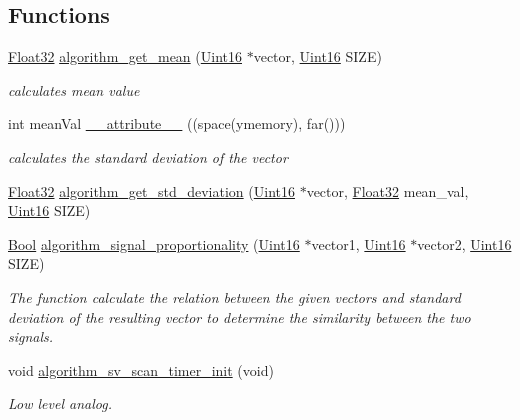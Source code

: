 \subsection*{Functions}
\begin{DoxyCompactItemize}
\item 
\hyperlink{a00072_a87d38f886e617ced2698fc55afa07637}{Float32} \hyperlink{a00038_ac02222eba93356b04a6327ffcf82b5cf}{algorithm\+\_\+get\+\_\+mean} (\hyperlink{a00072_a59a9f6be4562c327cbfb4f7e8e18f08b}{Uint16} $\ast$vector, \hyperlink{a00072_a59a9f6be4562c327cbfb4f7e8e18f08b}{Uint16} S\+I\+Z\+E)
\begin{DoxyCompactList}\small\item\em calculates mean value \end{DoxyCompactList}\item 
int mean\+Val \hyperlink{a00038_afc24892209555236c0000b91cfc8ab15}{\+\_\+\+\_\+attribute\+\_\+\+\_\+} ((space(ymemory), far()))
\begin{DoxyCompactList}\small\item\em calculates the standard deviation of the vector \end{DoxyCompactList}\item 
\hyperlink{a00072_a87d38f886e617ced2698fc55afa07637}{Float32} \hyperlink{a00038_a97eb6437dda088f144d791e49cd3dc2a}{algorithm\+\_\+get\+\_\+std\+\_\+deviation} (\hyperlink{a00072_a59a9f6be4562c327cbfb4f7e8e18f08b}{Uint16} $\ast$vector, \hyperlink{a00072_a87d38f886e617ced2698fc55afa07637}{Float32} mean\+\_\+val, \hyperlink{a00072_a59a9f6be4562c327cbfb4f7e8e18f08b}{Uint16} S\+I\+Z\+E)
\item 
\hyperlink{a00072_a253b248072cfc8bd812c69acd0046eed}{Bool} \hyperlink{a00038_a2925c58a9c3f5d3c957eaca9a95a6c3a}{algorithm\+\_\+signal\+\_\+proportionality} (\hyperlink{a00072_a59a9f6be4562c327cbfb4f7e8e18f08b}{Uint16} $\ast$vector1, \hyperlink{a00072_a59a9f6be4562c327cbfb4f7e8e18f08b}{Uint16} $\ast$vector2, \hyperlink{a00072_a59a9f6be4562c327cbfb4f7e8e18f08b}{Uint16} S\+I\+Z\+E)
\begin{DoxyCompactList}\small\item\em The function calculate the relation between the given vectors and standard deviation of the resulting vector to determine the similarity between the two signals. \end{DoxyCompactList}\item 
void \hyperlink{a00038_ab898d2d804c49cb0978d26f6af64e0e4}{algorithm\+\_\+sv\+\_\+scan\+\_\+timer\+\_\+init} (void)
\begin{DoxyCompactList}\small\item\em Low level analog. \end{DoxyCompactList}\item 

\end{DoxyCompactItemize}
